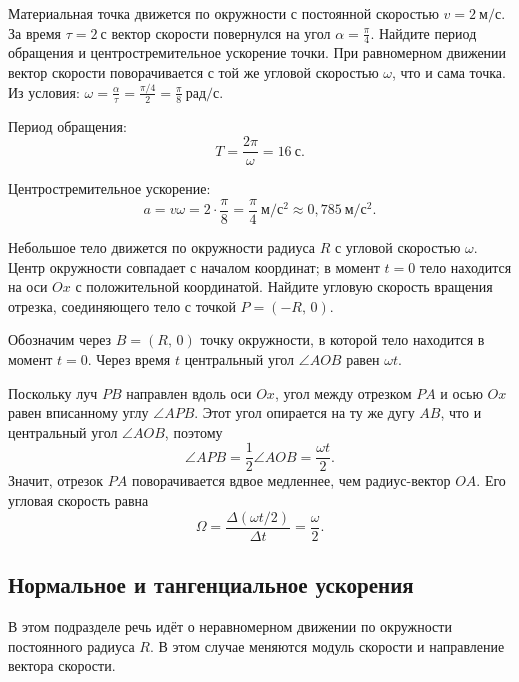 \documentclass[../main.tex]{subfiles}
\begin{document}
\begin{example}
Материальная точка движется по окружности с постоянной скоростью
$v = 2~\text{м}/\text{с}$. За время $\tau = 2~\text{с}$ вектор скорости повернулся на угол
$\alpha = \frac{\pi}{4}$. Найдите период обращения и центростремительное ускорение точки. При равномерном движении вектор скорости поворачивается с той же угловой
скоростью $\omega$, что и сама точка. Из условия:
$\omega = \frac{\alpha}{\tau} = \frac{\pi/4}{2} = \frac{\pi}{8}~\text{рад}/\text{с}$.

Период обращения:
\[
T = \frac{2\pi}{\omega} = 16~\text{с}.
\]

Центростремительное ускорение:
\[
a = v\omega = 2 \cdot \frac{\pi}{8}
= \frac{\pi}{4}~\text{м}/\text{с}^2 \approx 0{,}785~\text{м}/\text{с}^2.
\]
\end{example}

\begin{example}
Небольшое тело движется по окружности радиуса $R$ с угловой скоростью $\omega$.
Центр окружности совпадает с началом координат; в момент $t = 0$
тело находится на оси $Ox$ с положительной координатой.
Найдите угловую скорость вращения отрезка, соединяющего тело
с точкой $P = (-R,\, 0)$.

Обозначим через $B = (R,\, 0)$ точку окружности, в которой тело
находится в момент $t = 0$. Через время $t$ центральный угол
$\angle AOB$ равен $\omega t$.

Поскольку луч $PB$ направлен вдоль оси $Ox$, угол между отрезком $PA$
и осью $Ox$ равен вписанному углу $\angle APB$. Этот угол опирается на
ту же дугу $AB$, что и центральный угол $\angle AOB$, поэтому
\[
\angle APB = \frac{1}{2}\angle AOB = \frac{\omega t}{2}.
\]
Значит, отрезок $PA$ поворачивается вдвое медленнее, чем радиус-вектор
$OA$. Его угловая скорость равна
\[
\Omega = \frac{\Delta(\omega t/2)}{\Delta t} = \frac{\omega}{2}.
\]
\end{example}

\subsection{Нормальное и тангенциальное ускорения}

В этом подразделе речь идёт о неравномерном движении по окружности
постоянного радиуса $R$. В этом случае меняются модуль скорости и направление вектора скорости.
\end{document}
